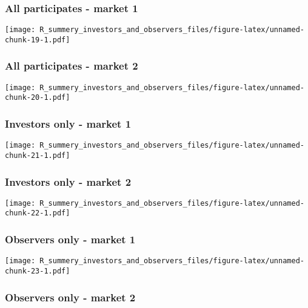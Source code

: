 \documentclass[]{article}
\begin{document}
\hypertarget{all-participates---market-1-1}{%
\subsubsection{All participates - market
1}\label{all-participates---market-1-1}}

\texttt{[image: R\_summery\_investors\_and\_observers\_files/figure-latex/unnamed-chunk-19-1.pdf]}

\hypertarget{all-participates---market-2-1}{%
\subsubsection{All participates - market
2}\label{all-participates---market-2-1}}

\texttt{[image: R\_summery\_investors\_and\_observers\_files/figure-latex/unnamed-chunk-20-1.pdf]}

\hypertarget{investors-only---market-1-1}{%
\subsubsection{Investors only - market
1}\label{investors-only---market-1-1}}

\texttt{[image: R\_summery\_investors\_and\_observers\_files/figure-latex/unnamed-chunk-21-1.pdf]}

\hypertarget{investors-only---market-2-1}{%
\subsubsection{Investors only - market
2}\label{investors-only---market-2-1}}

\texttt{[image: R\_summery\_investors\_and\_observers\_files/figure-latex/unnamed-chunk-22-1.pdf]}

\hypertarget{observers-only---market-1-1}{%
\subsubsection{Observers only - market
1}\label{observers-only---market-1-1}}

\texttt{[image: R\_summery\_investors\_and\_observers\_files/figure-latex/unnamed-chunk-23-1.pdf]}

\hypertarget{observers-only---market-2-1}{%
\subsubsection{Observers only - market
2}\label{observers-only---market-2-1}}
\end{document}
